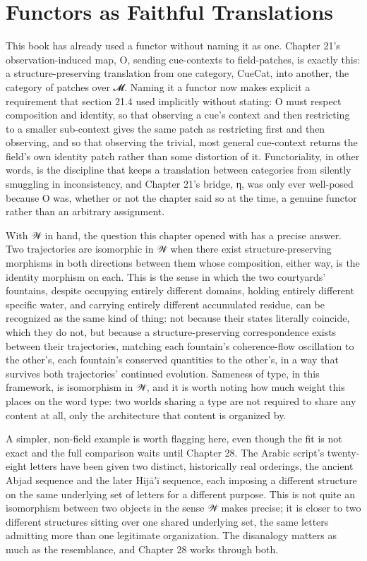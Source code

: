 \section{Functors as Faithful Translations}

This book has already used a functor without naming it as one. Chapter 21's observation-induced map, O, sending cue-contexts to field-patches, is exactly this: a structure-preserving translation from one category, CueCat, into another, the category of patches over 𝓜. Naming it a functor now makes explicit a requirement that section 21.4 used implicitly without stating: O must respect composition and identity, so that observing a cue's context and then restricting to a smaller sub-context gives the same patch as restricting first and then observing, and so that observing the trivial, most general cue-context returns the field's own identity patch rather than some distortion of it. Functoriality, in other words, is the discipline that keeps a translation between categories from silently smuggling in inconsistency, and Chapter 21's bridge, η, was only ever well-posed because O was, whether or not the chapter said so at the time, a genuine functor rather than an arbitrary assignment.

With 𝒲 in hand, the question this chapter opened with has a precise answer. Two trajectories are isomorphic in 𝒲 when there exist structure-preserving morphisms in both directions between them whose composition, either way, is the identity morphism on each. This is the sense in which the two courtyards' fountains, despite occupying entirely different domains, holding entirely different specific water, and carrying entirely different accumulated residue, can be recognized as the same kind of thing: not because their states literally coincide, which they do not, but because a structure-preserving correspondence exists between their trajectories, matching each fountain's coherence-flow oscillation to the other's, each fountain's conserved quantities to the other's, in a way that survives both trajectories' continued evolution. Sameness of type, in this framework, is isomorphism in 𝒲, and it is worth noting how much weight this places on the word type: two worlds sharing a type are not required to share any content at all, only the architecture that content is organized by.

A simpler, non-field example is worth flagging here, even though the fit is not exact and the full comparison waits until Chapter 28. The Arabic script's twenty-eight letters have been given two distinct, historically real orderings, the ancient Abjad sequence and the later Hijā'ī sequence, each imposing a different structure on the same underlying set of letters for a different purpose. This is not quite an isomorphism between two objects in the sense 𝒲 makes precise; it is closer to two different structures sitting over one shared underlying set, the same letters admitting more than one legitimate organization. The disanalogy matters as much as the resemblance, and Chapter 28 works through both.

